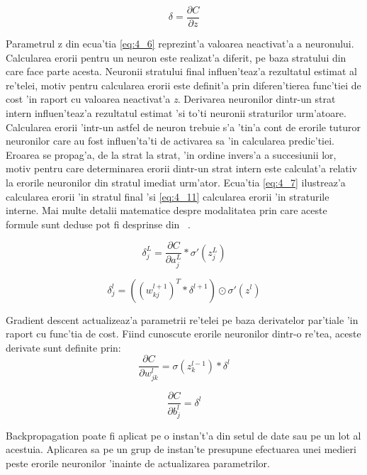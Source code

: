 \documentclass[12pt,a4paper,twoside]{report}
\begin{document}
\begin{equation}
\delta = \frac{\partial C}{\partial z}
\label{eq:4_6}
\end{equation}

Parametrul z din ecua'tia \ref{eq:4_6} reprezint'a valoarea neactivat'a a neuronului. Calcularea erorii pentru un neuron este realizat'a diferit, pe baza stratului din care face parte acesta. Neuronii stratului final influen'teaz'a rezultatul estimat al re'telei, motiv pentru calcularea erorii este definit'a prin diferen'tierea func'tiei de cost 'in raport cu valoarea neactivat'a \textit{z}. Derivarea neuronilor dintr-un strat intern influen'teaz'a rezultatul estimat 'si to'ti neuronii straturilor urm'atoare. Calcularea erorii 'intr-un astfel de neuron trebuie s'a 'tin'a cont de erorile tuturor neuronilor care au fost influen'ta'ti de activarea sa 'in calcularea predic'tiei. Eroarea se propag'a, de la strat la strat, 'in ordine invers'a a succesiunii lor, motiv pentru care determinarea erorii dintr-un strat intern este calculat'a relativ la erorile neuronilor din stratul imediat urm'ator. Ecua'tia \ref{eq:4_7} ilustreaz'a calcularea erorii 'in stratul final 'si \ref{eq:4_11} calcularea erorii 'in straturile interne. Mai multe detalii matematice despre modalitatea prin care aceste formule sunt deduse pot fi desprinse din ~\cite{nn}.

\begin{equation}
\delta_j^L = \frac{\partial C}{\partial a_j^L} * \sigma \prime (z_j^L)
\label{eq:4_7}
\end{equation}  


\begin{equation}
\delta_j^l = ((w_{kj}^{l+1})^T * \delta^{l+1}) \odot \sigma \prime (z^l)
\label{eq:4_11}
\end{equation} 

Gradient descent actualizeaz'a parametrii re'telei pe baza derivatelor par'tiale 'in raport cu func'tia de cost. Fiind cunoscute erorile neuronilor dintr-o re'tea, aceste derivate sunt definite prin:
\begin{equation}
\frac{\partial C}{\partial w_{jk}^l} = \sigma (z_k^{l-1}) * \delta^l
\label{eq:4_12}
\end{equation}

\begin{equation}
\frac{\partial C}{\partial b_j^l} = \delta^l
\label{eq:4_13}
\end{equation}

Backpropagation poate fi aplicat pe o instan't'a din setul de date sau pe un lot al acestuia. Aplicarea sa pe un grup de instan'te presupune efectuarea unei medieri peste erorile neuronilor 'inainte de actualizarea parametrilor.
 
\end{document}
